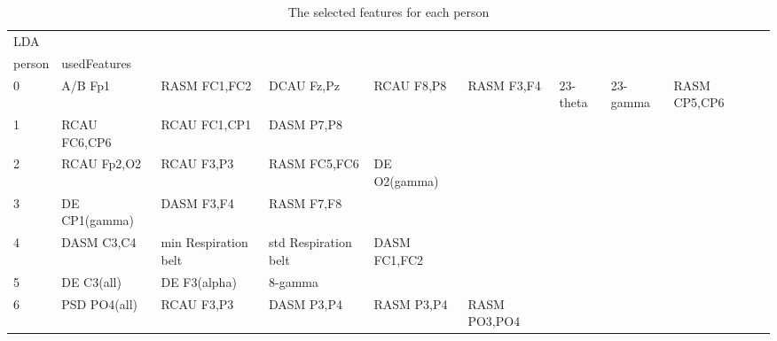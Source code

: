 \begin{landscape}
\begin{table}[]
\centering
\caption{The selected features for each person}
\begin{tabular}{l|llllllll}
LDA      &                       &                       &                      &                         &                         &                      &                      &                       &                       &                    \\
person   & usedFeatures          &                       &                      &                         &                         &                      &                      &                       &                       &                    \\
0        & A/B Fp1               & RASM FC1,FC2          & DCAU Fz,Pz           & RCAU F8,P8              & RASM F3,F4              & 23-theta             & 23-gamma             & RASM CP5,CP6          &                       &                    \\
1        & RCAU FC6,CP6          & RCAU FC1,CP1          & DASM P7,P8           &                         &                         &                      &                      &                       &                       &                    \\
2        & RCAU Fp2,O2           & RCAU F3,P3            & RASM FC5,FC6         & DE O2(gamma)            &                         &                      &                      &                       &                       &                    \\
3        & DE CP1(gamma)         & DASM F3,F4            & RASM F7,F8           &                         &                         &                      &                      &                       &                       &                    \\
4        & DASM C3,C4            & min Respiration belt  & std Respiration belt & DASM FC1,FC2            &                         &                      &                      &                       &                       &                    \\
5        & DE C3(all)            & DE F3(alpha)          & 8-gamma              &                         &                         &                      &                      &                       &                       &                    \\
6        & PSD PO4(all)          & RCAU F3,P3            & DASM P3,P4           & RASM P3,P4              & RASM PO3,PO4            &                      &                      &                       &                       &                    \\

\end{tabular}
\end{table}
\end{landscape}
